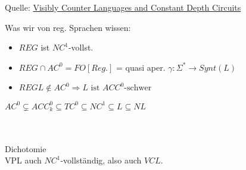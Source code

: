 Quelle: \href{http://drops.dagstuhl.de/opus/volltexte/2015/4944/pdf/44.pdf}{Visibly Counter Languages
and Constant Depth Circuits}

Was wir von reg. Sprachen wissen:
\begin{itemize}
\item $REG$ ist $NC^1$-vollst.
\item $REG\cap AC^0 = FO[Reg.]$
	= quasi aper. $\gamma:\Sigma^*\to Synt(L)$
\item $REG L \notin AC^0 \Rightarrow L \text{ ist } ACC^0 \text{-schwer}$
\end{itemize}
$AC^0 \subsetneq ACC_k^0 \subseteq TC^0 \subseteq NC^1 \subseteq L \subseteq NL$\\
\vspace{1cm}\\
\\
Dichotomie\\
VPL auch $NC^1$-vollständig, also auch $VCL$.

